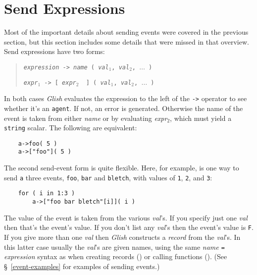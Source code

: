 \section{Send Expressions}
\label{sending-events}
\label{request-reply}
Most of the important details about sending events were covered in the
previous section, but this section includes some details that were missed
in that overview. Send expressions have two
forms:
\begin{quote}
    {\tt {\em expression} -> {\em name} ( {\em val$_1$}, {\em val$_2$}, $\ldots$ )}

    {\tt {\em expr$_	1$} -> [ {\em expr$_2$ } ] ( {\em val$_1$}, {\em val$_2$}, $\ldots$ )}
\end{quote}
In both cases {\em Glish} evaluates the expression to the left of the
\verb+->+ operator to see whether it's an {\tt agent}.  If not,
an error is generated.  Otherwise the name of the event is taken from
either {\em name} or by evaluating {\em expr$_2$}, which must yield
a {\tt string} scalar.  The following are equivalent:
\begin{verbatim}
    a->foo( 5 )
    a->["foo"]( 5 )
\end{verbatim}

The second send-event form is quite flexible.  Here, for example,
is one way to send {\tt a} three events, {\tt foo}, {\tt bar} and
{\tt bletch}, with values of {\tt 1}, {\tt 2}, and {\tt 3}:
\begin{verbatim}
    for ( i in 1:3 )
        a->["foo bar bletch"[i]]( i )
\end{verbatim}

The value of the event is taken from the various {\em val\/}'s.  If
you specify just one {\em val} then that's the event's value.  If
you don't list any {\em val\/}'s then the event's value is {\tt F}.
If you give more than one {\em val} then {\em Glish} constructs a
{\em record} from the {\em val\/}'s.  In this latter case usually the
{\em val}'s are given names, using the same {\em name {\tt =} expression}
syntax as when creating records () or calling
functions ().  (See \S~\ref{event-examples} for examples
of sending events.)

